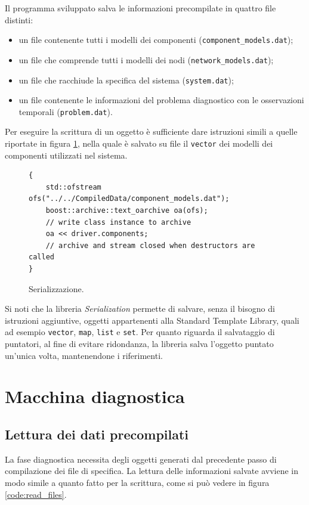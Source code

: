 Il programma sviluppato salva le informazioni precompilate in quattro file distinti:
\begin{itemize}
\item un file contenente tutti i modelli dei componenti (\verb|component_models.dat|);
\item un file che comprende tutti i modelli dei nodi (\verb|network_models.dat|);
\item un file che racchiude la specifica del sistema (\verb|system.dat|);
\item un file contenente le informazioni del problema diagnostico con le osservazioni temporali (\verb|problem.dat|).
\end{itemize}
Per eseguire la scrittura di un oggetto è sufficiente dare istruzioni simili a quelle riportate in figura \ref{code:serialize_main}, nella quale è salvato su file il \verb|vector| dei modelli dei componenti utilizzati nel sistema.

\begin{figure}[htbp]
\begin{verbatim}
{
    std::ofstream ofs("../../CompiledData/component_models.dat");
    boost::archive::text_oarchive oa(ofs);
    // write class instance to archive
    oa << driver.components;
    // archive and stream closed when destructors are called
}
\end{verbatim}
\caption{Serializzazione.}
\label{code:serialize_main}
\end{figure}

Si noti che la libreria \emph{Serialization} permette di salvare, senza il bisogno di istruzioni aggiuntive, oggetti appartenenti alla Standard Template Library, quali ad esempio \verb|vector|, \verb|map|, \verb|list| e \verb|set|. Per quanto riguarda il salvataggio di puntatori, al fine di evitare ridondanza, la libreria salva l'oggetto puntato un'unica volta, mantenendone i riferimenti.


\section{Macchina diagnostica}

\subsection{Lettura dei dati precompilati}
La fase diagnostica necessita degli oggetti generati dal precedente passo di compilazione dei file di specifica. La lettura delle informazioni salvate avviene in modo simile a quanto fatto per la scrittura, come si può vedere in figura \ref{code:read_files}.


